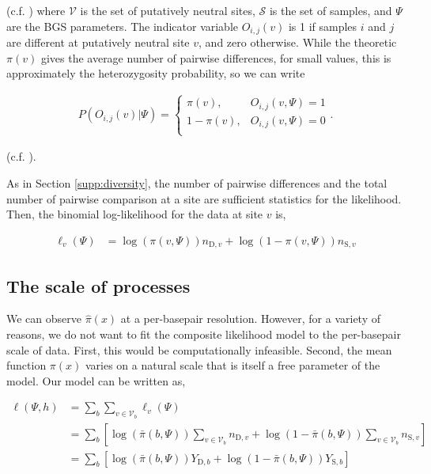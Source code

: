 \documentclass[11pt]{article}
\begin{document}
(c.f. \cite{McVicker2009-ax,Elyashiv2016-vt,Murphy2022-sj}) where $\mathcal{V}$
is the set of putatively neutral sites, $\mathcal{S}$ is the set of samples,
and $\Psi$ are the BGS parameters. The indicator variable $O_{i,j}(v)$ is 1 if
samples $i$ and $j$ are different at putatively neutral site $v$, and zero
otherwise. While the theoretic $\pi(v)$ gives the average number of pairwise
differences, for small values, this is approximately the heterozygosity
probability, so we can write

\begin{align}
  P(O_{i,j}(v) | \Psi) = 
    \begin{cases}
      \pi(v), & O_{i,j}(v, \Psi) = 1 \\
      1-\pi(v), & O_{i,j}(v, \Psi) = 0 \\
    \end{cases}.
\end{align}

(c.f. \cite{Elyashiv2016-vt}). 

As in Section \ref{supp:diversity}, the number of pairwise differences and
the total number of pairwise comparison at a site are sufficient statistics for
the likelihood. Then, the binomial log-likelihood for the data at site $v$ is,

\begin{align}
  \ell_v(\Psi) &= \log(\pi(v, \Psi)) n_{\text{D},v} + \log(1-\pi(v, \Psi)) n_{\text{S},{v}}
\end{align}

\subsection{The scale of processes}

We can observe $\widehat{\pi}(x)$ at a per-basepair resolution. However, for a
variety of reasons, we do not want to fit the composite likelihood model to the
per-basepair scale of data. First, this would be computationally infeasible.
Second, the mean function $\pi(x)$ varies on a natural scale that is itself a
free parameter of the model. Our model can be written as, 

\begin{align}
  \ell(\Psi, h) &= \sum_{b} \sum_{v \in \mathcal{V}_b} \ell_v(\Psi) \\
             &= \sum_{b} \left[\log(\bar{\pi}(b, \Psi)) \sum_{v \in \mathcal{V}_b} n_{\text{D},v} + \log(1-\bar{\pi}(b, \Psi)) \sum_{v \in \mathcal{V}_b} n_{\text{S},{v}}\right] \\
             &= \sum_{b} \left[\log(\bar{\pi}(b, \Psi)) Y_{\text{D},b} + \log(1-\bar{\pi}(b, \Psi)) Y_{\text{S},{b}}\right] \\
\end{align}
\end{document}
